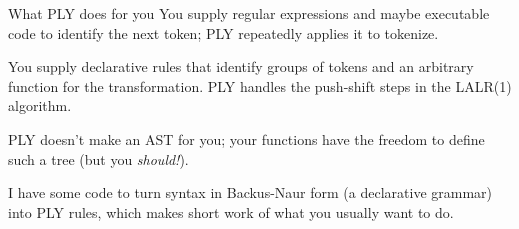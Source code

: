 \documentclass[aspectratio=169]{beamer}
\begin{document}
\begin{frame}{What PLY does for you}
\vspace{0.5 cm}
You supply regular expressions and maybe executable code to identify the next token; PLY repeatedly applies it to tokenize.

\vspace{0.5 cm}
You supply declarative rules that identify groups of tokens and an arbitrary function for the transformation. PLY handles the push-shift steps in the LALR(1) algorithm.

\vspace{0.5 cm}
PLY doesn't make an AST for you; your functions have the freedom to define such a tree (but you {\it should!}).

\vspace{0.5 cm}
I have some code to turn syntax in Backus-Naur form (a declarative grammar) into PLY rules, which makes short work of what you usually want to do.
\end{frame}
\end{document}
